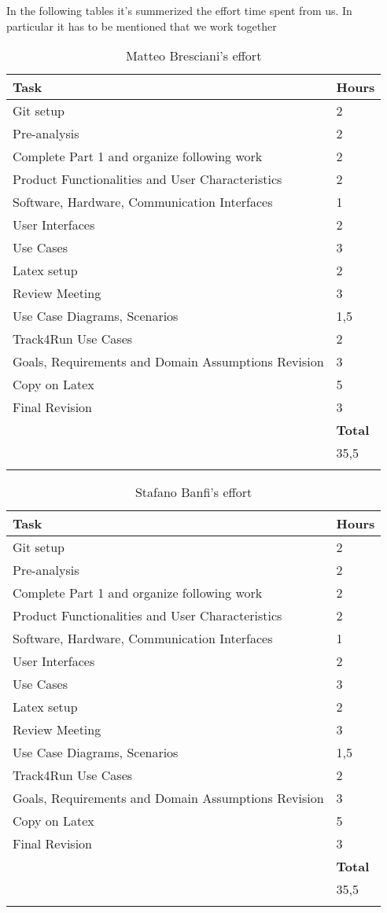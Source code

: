 In the following tables it's summerized the effort time spent from us. In particular it has to be mentioned that we work together 
		
	\begin{longtable}{| p{5 cm} | p{2 cm} |} 
			\hline
			{\bf Task} & {\bf Hours}\\
			\hline
            Git setup & 2 \\
			Pre-analysis & 2 \\
			Complete Part 1 and organize following work & 2 \\
			Product Functionalities and User Characteristics& 2 \\
			Software, Hardware, Communication Interfaces & 1 \\
			User Interfaces & 2 \\
			Use Cases & 3 \\
			Latex setup & 2 \\
			Review Meeting & 3 \\
			Use Case Diagrams, Scenarios & 1,5\\
			Track4Run Use Cases & 2 \\
			Goals, Requirements and Domain Assumptions Revision & 3 \\
			Copy on Latex & 5 \\
			Final Revision & 3 \\
			\hline
			&  {\bf Total} \\
			\hline
			&  35,5 \\
			\hline
			\caption{Matteo Bresciani's effort}
		\end{longtable}
	
			\begin{longtable}{| p{5 cm} | p{2 cm} |} 
			\hline
			{\bf Task} & {\bf Hours}\\
			\hline
            Git setup & 2 \\
			Pre-analysis & 2 \\
			Complete Part 1 and organize following work & 2 \\
			Product Functionalities and User Characteristics& 2 \\
			Software, Hardware, Communication Interfaces & 1 \\
			User Interfaces & 2 \\
			Use Cases & 3 \\
			Latex setup & 2 \\
			Review Meeting & 3 \\
			Use Case Diagrams, Scenarios & 1,5\\
			Track4Run Use Cases & 2 \\
			Goals, Requirements and Domain Assumptions Revision & 3 \\
			Copy on Latex & 5 \\
			Final Revision & 3 \\
			\hline
			&  {\bf Total} \\
			\hline
			&  35,5 \\
			\hline
			\caption{Stafano Banfi's effort}
		\end{longtable}
	
	